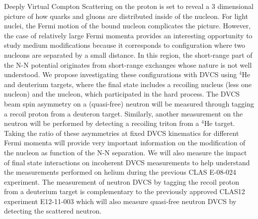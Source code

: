 Deeply Virtual Compton Scattering on the proton is set to reveal a 3 dimensional picture
of how quarks and gluons are distributed inside of the nucleon. For light nuclei, the
Fermi motion of the bound nucleon complicates the picture. However, the case of
relatively large Fermi momenta provides an interesting opportunity to study medium
modifications because it corresponds to configuration where two nucleons are separated
by a small distance. In this region, the short-range part of the N-N potential originates
from short-range exchanges whose nature is not well understood.
We propose investigating these configurations with DVCS using $^4$He and
deuterium targets, where the final state includes a recoiling nucleus (less one nucleon)
and the nucleon, which participated in the hard process. The DVCS beam spin
asymmetry on a (quasi-free) neutron will be measured through tagging a recoil proton
from a deuteron target. Similarly, another measurement on the neutron will be performed
by detecting a recoiling triton from a $^4$He target. Taking the ratio of these asymmetries at
fixed DVCS kinematics for different Fermi momenta will provide very important
information on the modification of the nucleon as function of the N-N separation.
We will also measure the impact of final state interactions on incoherent DVCS
measurements to help understand the measurements performed on helium during the
previous CLAS E-08-024 experiment. The measurement of neutron DVCS by tagging
the recoil proton from a deuterium target is complementary to the previously approved
CLAS12 experiment E12-11-003 which will also measure quasi-free neutron DVCS by
detecting the scattered neutron.

\newpage

